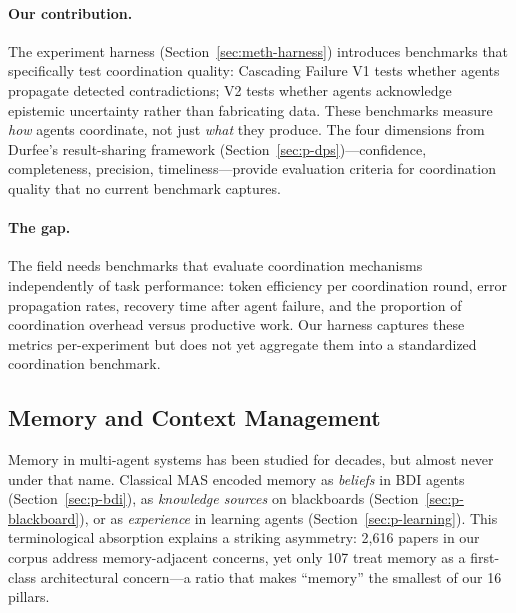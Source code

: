 \documentclass{article}
\begin{document}
\paragraph{Our contribution.}
The experiment harness (Section~\ref{sec:meth-harness}) introduces benchmarks that
specifically test coordination quality: Cascading Failure V1 tests whether agents
propagate detected contradictions; V2 tests whether agents acknowledge epistemic
uncertainty rather than fabricating data. These benchmarks measure \emph{how} agents
coordinate, not just \emph{what} they produce. The four dimensions from
Durfee's result-sharing framework (Section~\ref{sec:p-dps})---confidence, completeness,
precision, timeliness---provide evaluation criteria for coordination quality that no
current benchmark captures.

\paragraph{The gap.}
The field needs benchmarks that evaluate coordination mechanisms independently of task
performance: token efficiency per coordination round, error propagation rates, recovery
time after agent failure, and the proportion of coordination overhead versus productive
work. Our harness captures these metrics per-experiment but does not yet aggregate them
into a standardized coordination benchmark.

\subsection{Memory and Context Management}
\label{sec:p-memory}

%
%
%

Memory in multi-agent systems has been studied for decades, but almost never under
that name. Classical MAS encoded memory as \emph{beliefs} in BDI agents
(Section~\ref{sec:p-bdi}), as \emph{knowledge sources} on blackboards
(Section~\ref{sec:p-blackboard}), or as \emph{experience} in learning agents
(Section~\ref{sec:p-learning}). This terminological absorption explains a striking
asymmetry: 2,616 papers in our corpus address memory-adjacent concerns, yet only 107
treat memory as a first-class architectural concern---a ratio that makes ``memory''
the smallest of our 16 pillars.
\end{document}
